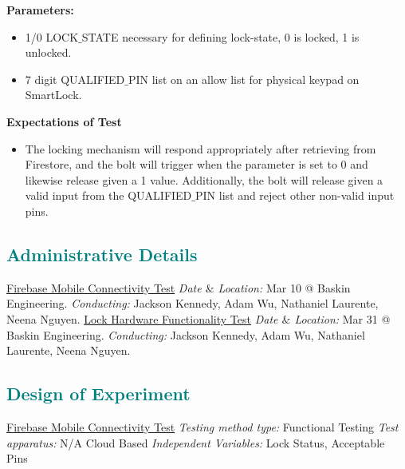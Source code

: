 \textbf{Parameters:}
\begin{itemize}

\item 1/0 LOCK$\_$STATE necessary for defining lock-state, 0 is locked, 1 is unlocked.
\item 7 digit QUALIFIED$\_$PIN list on an allow list for physical keypad on SmartLock.
\end{itemize}
\textbf{Expectations of Test}
\begin{itemize}

\item The locking mechanism will respond appropriately after retrieving from Firestore, and the bolt will trigger when the parameter is set to 0 and likewise release given a 1 value. Additionally, the bolt will release given a valid input from the QUALIFIED$\_$PIN list and reject other non-valid input pins.

\end{itemize}
\textcolor{teal}{\subsection{Administrative Details}}
\noindent\underline{Firebase Mobile Connectivity Test}
\newline
\newline
\textit{Date $\&$ Location:} Mar 10 @ Baskin Engineering.
\newline
\textit{Conducting:} Jackson Kennedy, Adam Wu, Nathaniel Laurente, Neena Nguyen.
\newline
\newline
\underline{Lock Hardware Functionality Test}
\newline
\newline
\textit{Date $\&$ Location:} Mar 31 @ Baskin Engineering.
\newline
\textit{Conducting:} Jackson Kennedy, Adam Wu, Nathaniel Laurente, Neena Nguyen.
\newline
\textcolor{teal}{\subsection{Design of Experiment}}
\noindent\underline{Firebase Mobile Connectivity Test}
\newline
\textit{Testing method type:} Functional Testing
\newline
\textit{Test apparatus:} N/A Cloud Based
\newline
\textit{Independent Variables:} Lock Status, Acceptable Pins
\newline
